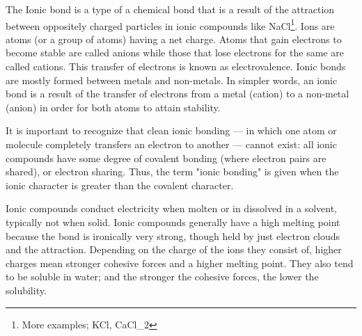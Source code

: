 \begin{chembox}{}
{The {Ionic bond} is a type of a {chemical bond} that is a result of the attraction {between oppositely charged particles} in ionic compounds like NaCl\footnote{More examples; KCl, CaCl_2}. Ions are atoms (or a group of atoms) having a {net charge}. Atoms that {gain electrons} to become {stable} are called {anions} while those that {lose electrons} for the same are called {cations}. This {transfer of electrons} is known as {electrovalence}. Ionic bonds are {mostly} formed {between metals and non-metals}. In simpler words, an ionic bond is a result of the transfer of electrons from a metal (cation) to a non-metal (anion) in order for both atoms to attain stability.

It is important to recognize that clean ionic bonding — in which one atom or molecule completely transfers an electron to another — cannot exist: all ionic compounds have some degree of covalent bonding (where electron pairs are shared), or electron sharing. Thus, the term "ionic bonding" is given when the ionic character is greater than the covalent character.

Ionic compounds conduct electricity when molten or in dissolved in a solvent, typically not when solid. Ionic compounds generally have a high melting point because the bond is ironically very strong, though held by just electron clouds and the attraction. Depending on the charge of the ions they consist of, higher charges mean stronger cohesive forces and a higher melting point. They also tend to be soluble in water; and the stronger the cohesive forces, the lower the solubility.

}
\end{chembox}
